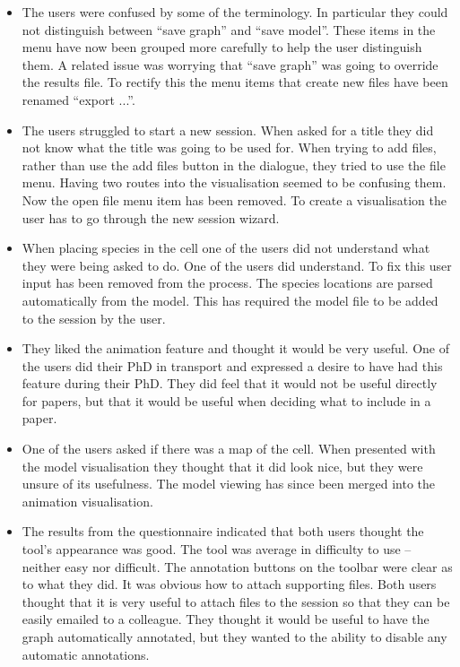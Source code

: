 \begin{itemize}
\item The users were confused by some of the terminology.  In particular they could not distinguish between ``save graph'' and ``save model''. These items in the menu have now been grouped more carefully to help the user distinguish them.  A related issue was worrying that ``save graph'' was going to override the results file.  To rectify this the menu items that create new files have been renamed ``export ...''.
\item The users struggled to start a new session.  When asked for a title they did not know what the title was going to be used for.  When trying to add files, rather than use the add files button in the dialogue, they tried to use the file menu.  Having two routes into the visualisation seemed to be confusing them.  Now the open file menu item has been removed.  To create a visualisation the user has to go through the new session wizard.
\item When placing species in the cell one of the users did not understand what they were being asked to do.  One of the users did understand.  To fix this user input has been removed from the process.  The species locations are parsed automatically from the model.  This has required the model file to be added to the session by the user.
\item They liked the animation feature and thought it would be very useful. One of the users did their PhD in transport and expressed a desire to have had this feature during their PhD.  They did feel that it would not be useful directly for papers, but that it would be useful when deciding what to include in a paper.
\item One of the users asked if there was a map of the cell.  When presented with the model visualisation they thought that it did look nice, but they were unsure of its usefulness.  The model viewing has since been merged into the animation visualisation.
\item The results from the questionnaire indicated that both users thought the tool's appearance was good.  The tool was average in difficulty to use -- neither easy nor difficult. The annotation buttons on the toolbar were clear as to what they did. It was obvious how to attach supporting files.  Both users thought that it is very useful to attach files to the session so that they can be easily emailed to a colleague.  They thought it would be useful to have the graph automatically annotated, but they wanted to the ability to disable any automatic annotations.
\end{itemize}

